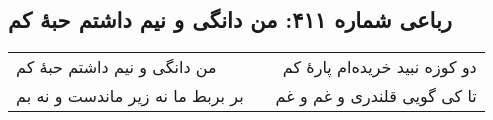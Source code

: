\begin{center}
\section*{رباعی شماره ۴۱۱: من دانگی و نیم داشتم حبهٔ کم}
\label{sec:sh411}
\begin{longtable}{l p{0.5cm} r}
من دانگی و نیم داشتم حبهٔ کم
&&
دو کوزه نبید خریده‌ام پارهٔ کم
\\
بر بربط ما نه زیر ماندست و نه بم
&&
تا کی گویی قلندری و غم و غم
\\
\end{longtable}
\end{center}
